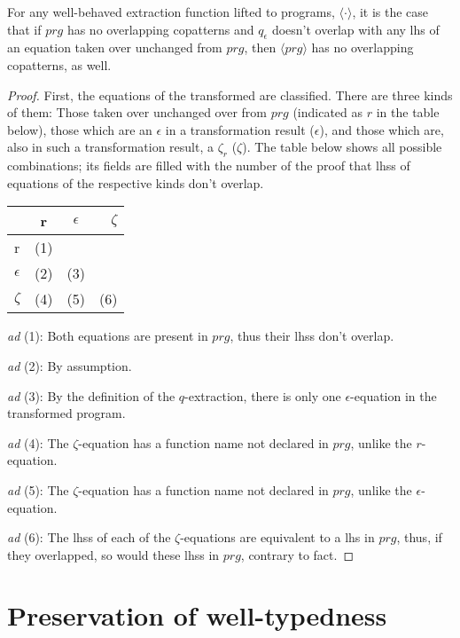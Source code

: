 \begin{proposition}
For any well-behaved extraction function lifted to programs, $\langle \cdot \rangle$, it is the case that if $prg$ has no overlapping copatterns and $q_\epsilon$ doesn't overlap with any lhs of an equation taken over unchanged from $prg$, then $\langle prg \rangle$ has no overlapping copatterns, as well.

\begin{proof}
First, the equations of the transformed are classified. There are three kinds of them: Those taken over unchanged over from $prg$ (indicated as $r$ in the table below), those which are an $\epsilon$ in a transformation result ($\epsilon$), and those which are, also in such a transformation result, a $\zeta_r$ ($\zeta$). The table below shows all possible combinations; its fields are filled with the number of the proof that lhss of equations of the respective kinds don't overlap.

\begin{tabular}{ l | c | c | r }  & r & $\epsilon$ & $\zeta$ \\ \hline r & (1) &  &  \\ \hline $\epsilon$ & (2) & (3) &  \\ \hline $\zeta$ & (4) & (5) & (6) \\ \hline \end{tabular}

\textit{ad} (1): Both equations are present in $prg$, thus their lhss don't overlap.

\textit{ad} (2): By assumption.

\textit{ad} (3): By the definition of the $q$-extraction, there is only one $\epsilon$-equation in the transformed program.

\textit{ad} (4): The $\zeta$-equation has a function name not declared in $prg$, unlike the $r$-equation.

\textit{ad} (5): The $\zeta$-equation has a function name not declared in $prg$, unlike the $\epsilon$-equation.

\textit{ad} (6): The lhss of each of the $\zeta$-equations are equivalent to a lhs in $prg$, thus, if they overlapped, so would these lhss in $prg$, contrary to fact.
\end{proof}
\end{proposition}

\section{Preservation of well-typedness}

